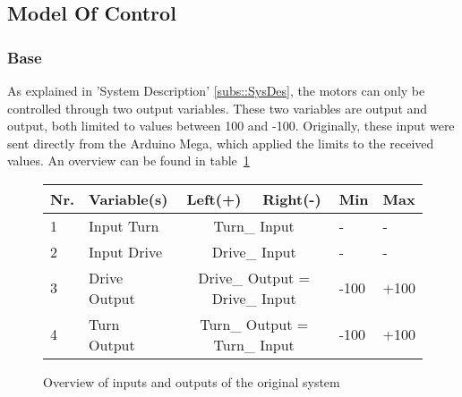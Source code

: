 \subsection{Model Of Control}
\subsubsection{Base}
As explained in 'System Description' \ref{subs::SysDes}, the motors can only be controlled through two output variables.
These two variables are  output and  output, both limited to values between 100 and -100.
Originally, these input were sent directly from the Arduino Mega, which applied the limits to the received values.
An overview can be found in table~\ref{tab::varoverview}
\begin{figure}[H]
\begin{tabular}{|l|l|c|c|l|l|}
\hline
\textbf{Nr.} & \textbf{Variable(s)} & \textbf{Left(+)} & \textbf{Right(-)} & \textbf{Min} & \textbf{Max} \\ \hline
1 & Input Turn 	& \multicolumn{2}{c|}{Turn\_ Input} 				& - 		& -		\\ \hline
2 & Input Drive 	& \multicolumn{2}{c|}{Drive\_ Input} 				& - 		& - 		\\ \hline
3 & Drive Output & \multicolumn{2}{c|}{Drive\_ Output = Drive\_ Input}	& -100 	& +100 	\\ \hline
4 & Turn Output 	& \multicolumn{2}{c|}{Turn\_ Output = Turn\_ Input}	& -100	& +100	\\ \hline
\end{tabular}
\caption{Overview of inputs and outputs of the original system}
\label{tab::varoverview}
\end{figure}


